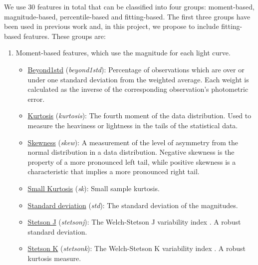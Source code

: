 \documentclass[a4paper,fleqn,usenatbib]{mnras}
\begin{document}
We use 30 features in total that can be classified into four groups:
moment-based, magnitude-based, percentile-based and fitting-based. 
The first three groups have been used in previous work and, in this project, we propose to include fitting-based features.
These groups are:

\begin{enumerate}
    
\item Moment-based features, which use the magnitude for each light curve.
  \begin{itemize}
  \item \underline{Beyond1std} (\textit{beyond1std}): 
    Percentage of observations which are over or under one standard
    deviation from the weighted average. Each weight is calculated as
    the inverse of the corresponding observation's photometric error. 
        \item \underline{Kurtosis} (\textit{kurtosis}): 
        The fourth moment of the data distribution. Used to measure
        the heaviness or lightness in the tails of the statistical
        data. 
        \item \underline{Skewness} (\textit{skew}): 
        A measurement of the level of asymmetry from the normal
        distribution in a data distribution. Negative skewness is the
        property of a more pronounced left tail, while positive
        skewness is a characteristic that implies a more pronounced
        right tail. 
        \item \underline{Small Kurtosis} (\textit{sk}):
        Small sample kurtosis.
        \item \underline{Standard deviation} (\textit{std}):
        The standard deviation of the magnitudes.
        \item \underline{Stetson J} (\textit{stetson\textunderscore j}):
        The Welch-Stetson J variability index
        \cite{1996PASP..108..851S}. A robust standard deviation. 
        \item \underline{Stetson K} (\textit{stetson\textunderscore k}): 
        The Welch-Stetson K variability index
        \cite{1996PASP..108..851S}. A robust kurtosis measure. 
    \end{itemize}
    

\end{enumerate}
\end{document}

